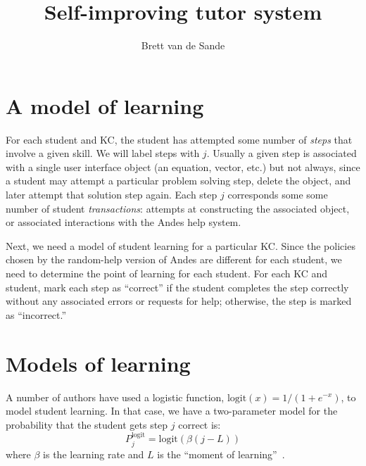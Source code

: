 \documentclass[11pt,letterpaper]{article}
\begin{document}
\title{Self-improving tutor system}
\author{Brett van de Sande}

%


\maketitle

\section{A model of learning}

For each student and KC, the student has attempted some number of 
{\em steps} that involve a given skill.   We will label
steps with $j$.  Usually a given step is associated
with a single user interface object (an equation, vector, etc.)  but
not always, since a student may attempt a particular problem solving
step, delete the object, and later attempt that solution step again.
Each step $j$ corresponds some some number of student {\em transactions}:
attempts at constructing the associated object, or associated
interactions with the Andes help system.  

Next, we need a model of student learning for a particular KC.
Since the policies chosen by the random-help version of Andes
are different for each student,
we need to determine the point of learning for each student.
For each KC and student, mark each step as ``correct'' if
the student completes the step correctly without any associated errors or 
requests for help; otherwise, the step is marked as ``incorrect.''

\section{Models of learning}

A number of authors have used a logistic function, 
$\mathrm{logit}(x)=1/\left(1+e^{-x}\right)$, to 
model student learning.  In that case, we have a two-parameter
model for the probability that the student gets step $j$ correct is:
%
\begin{equation}
               P_j^\mathrm{logit} = \mathrm{logit}\left(\beta (j-L)\right)
\end{equation}
%
where $\beta$ is the learning rate and $L$ is the ``moment
of learning''~\cite{aha}.
\end{document}

